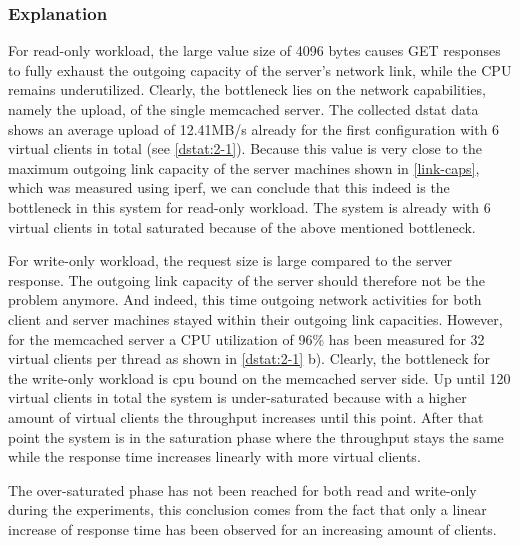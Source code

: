 \documentclass[11pt,a4paper]{article}
\begin{document}
\subsubsection{Explanation}
For read-only workload, the large value size of 4096 bytes causes GET responses to fully exhaust the outgoing capacity of the server's network link, while the CPU remains underutilized. Clearly, the bottleneck lies on the network capabilities, namely the upload, of the single memcached server. The collected dstat data shows an average upload of 12.41MB/s already for the first configuration with 6 virtual clients in total (see \autoref{dstat:2-1}). Because this value is very close to the maximum outgoing link capacity of the server machines shown in \autoref{link-caps}, which was measured using iperf, we can conclude that this indeed is the bottleneck in this system for read-only workload. The system is already with 6 virtual clients in total saturated because of the above mentioned bottleneck.

For write-only workload, the request size is large compared to the server response. The outgoing link capacity of the server should therefore not be the problem anymore. And indeed, this time outgoing network activities for both client and server machines stayed within their outgoing link capacities. However, for the memcached server a CPU utilization of 96\% has been measured for 32 virtual clients per thread as shown in \autoref{dstat:2-1} b). Clearly, the  bottleneck for the write-only workload is cpu bound on the memcached server side.
Up until 120 virtual clients in total the system  is under-saturated because with a higher amount of virtual clients the throughput increases until this point. After that point the system is in the saturation phase where the throughput stays the same while the response time increases linearly with more virtual clients.

The over-saturated phase has not been reached for both read and write-only during the experiments, this conclusion comes from the fact that only a linear increase of response time has been observed for an increasing amount of clients.
\end{document}
